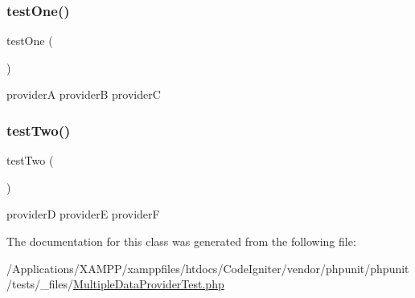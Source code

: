 \subsubsection{\texorpdfstring{test\+One()}{testOne()}}
{\footnotesize\ttfamily test\+One (\begin{DoxyParamCaption}{ }\end{DoxyParamCaption})}

providerA  providerB  providerC \mbox{\label{class_multiple_data_provider_test_a4fb9974ce113d5d1db8075e0db0dc9b6}} 
\subsubsection{\texorpdfstring{test\+Two()}{testTwo()}}
{\footnotesize\ttfamily test\+Two (\begin{DoxyParamCaption}{ }\end{DoxyParamCaption})}

providerD  providerE  providerF 

The documentation for this class was generated from the following file\+:\begin{DoxyCompactItemize}
\item 
/\+Applications/\+X\+A\+M\+P\+P/xamppfiles/htdocs/\+Code\+Igniter/vendor/phpunit/phpunit/tests/\+\_\+files/\mbox{\hyperlink{_multiple_data_provider_test_8php}{Multiple\+Data\+Provider\+Test.\+php}}\end{DoxyCompactItemize}
